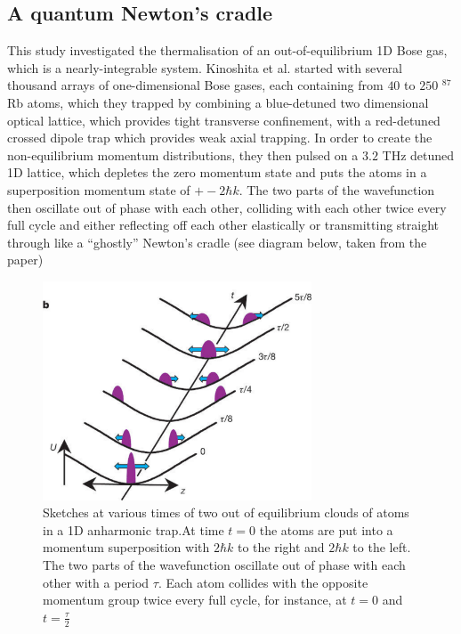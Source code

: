 \documentclass[a4paper,10pt]{article}
\begin{document}
\subsection{A quantum Newton's cradle}
This study investigated the thermalisation of an out-of-equilibrium 1D Bose gas, which is a  nearly-integrable system. Kinoshita et al. \cite{Kinoshita2006} started with
several thousand arrays of one-dimensional Bose gases, each containing from $40$ to $250$ $^{87}$Rb atoms, which they trapped by combining a blue-detuned  two dimensional optical lattice, which provides tight transverse confinement, with a red-detuned crossed dipole trap  
which provides weak axial trapping. In order to create the non-equilibrium momentum distributions, they then pulsed on a $3.2$ THz detuned 1D lattice, which depletes the zero momentum state
and puts the atoms in a superposition momentum state of $+-2\hbar k$. The two parts of the wavefunction then oscillate out of phase with each other, colliding with each other twice every full cycle
and either reflecting off each other elastically or transmitting straight through like a ``ghostly'' Newton's cradle (see diagram below, taken from the paper)

\begin{figure}[H]
 \includegraphics[width=8cm]{quantum_newtons_cradle}
 \centering
 \caption*{Sketches at various times of two out of equilibrium
clouds of atoms in a 1D anharmonic trap.At time $t=0$ the atoms are put into a momentum superposition with $2\hbar k$ to the right and $2\hbar k$ to the left. The two parts of the 
wavefunction oscillate out of phase with each other with a period $\tau$. Each atom collides with the opposite momentum group
twice every full cycle, for instance, at $t=0$ and $t=\frac{\tau}{2}$}
 \end{figure}
\end{document}
